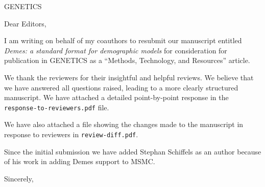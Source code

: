 \documentclass{letter}
\begin{document}
\begin{letter}{GENETICS}

\opening{Dear Editors,}

I am writing on behalf of my coauthors to resubmit our manuscript entitled
\emph{Demes: a standard format for demographic models}
for consideration for publication in GENETICS
as a ``Methods, Technology, and Resources'' article.

We thank the reviewers for their insightful and helpful reviews. We
believe that we have answered all questions raised, leading to a more
clearly structured manuscript. We have attached
a detailed point-by-point response in the \texttt{response-to-reviewers.pdf}
file.

We have also attached a file showing the changes made to the manuscript
in response to reviewers in \texttt{review-diff.pdf}.

Since the initial submission we have added Stephan Schiffels
as an author because of his work in adding Demes support
to MSMC.

\closing{Sincerely,}

\end{letter}
\end{document}
